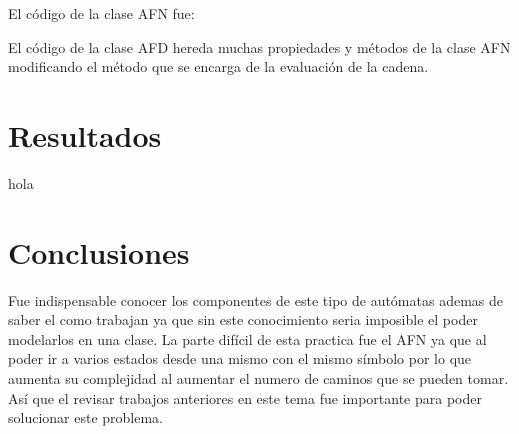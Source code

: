 \documentclass[16pt, titlepage]{article}
\begin{document}
	El código de la clase AFN fue:
	
	El código de la clase AFD hereda muchas propiedades y métodos de la clase AFN modificando el método que se encarga de la evaluación de la cadena.
	\section{Resultados}
	hola
	\section{Conclusiones}
	Fue indispensable conocer los componentes de este tipo de autómatas ademas de saber el como trabajan ya que sin este conocimiento seria imposible el poder modelarlos en una clase. La parte difícil de esta practica fue el AFN ya que al poder ir a varios estados desde una mismo con el mismo símbolo por lo que aumenta su complejidad al aumentar el numero de caminos que se pueden tomar. Así que el revisar trabajos anteriores en este tema fue importante para poder solucionar este problema.
\end{document}
